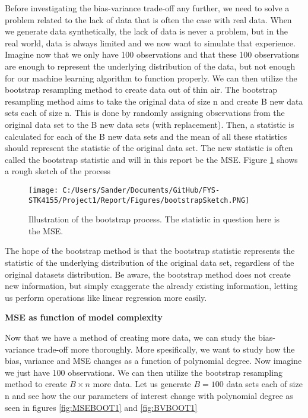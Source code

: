 \documentclass[12pt,a4paper]{article}
\begin{document}
\noindent Before investigating the bias-variance trade-off any further, we need to solve a problem related to the lack of data that is often the case with real data. When we generate data synthetically, the lack of data is never a problem, but in the real world, data is always limited and we now want to simulate that experience. Imagine now that we only have 100 observations and that these 100 observations are enough to represent the underlying distribution of the data, but not enough for our machine learning algorithm to function properly. We can then utilize the bootstrap resampling method to create data out of thin air. The bootstrap resampling method aims to take the original data of size n and create B new data sets each of size n. This is done by randomly assigning observations from the original data set to the B new data sets (with replacement). Then, a statistic is calculated for each of the B new data sets and the mean of all these statistics should represent the statistic of the original data set. The new statistic is often called the bootstrap statistic and will in this report be the MSE. Figure \ref{fig:Bootsketch} shows a rough sketch of the process

\begin{figure}[H]
\centering
\texttt{[image: C:/Users/Sander/Documents/GitHub/FYS-STK4155/Project1/Report/Figures/bootstrapSketch.PNG]}
\caption{\label{fig:Bootsketch} Illustration of the bootstrap process. The statistic in question here is the MSE.}
\end{figure}

\noindent The hope of the bootstrap method is that the bootstrap statistic represents the statistic of the underlying distribution of the original data set, regardless of the original datasets distribution. Be aware, the bootstrap method does not create new information, but simply exaggerate the already existing information, letting us perform operations like linear regression more easily.

\begin{center}
\large{\textbf{MSE as function of model complexity}}
\end{center}

\noindent Now that we have a method of creating more data, we can study the bias-variance trade-off more thoroughly. More spesifically, we want to study how the bias, variance and MSE changes as a function of polynomial degree. Now imagine we just have 100 observations. We can then utilize the bootstrap resampling method to create $B \times n$ more data. Let us generate $B = 100$ data sets each of size n and see how the our parameters of interest change with polynomial degree as seen in figures \ref{fig:MSEBOOT1} and \ref{fig:BVBOOT1}
\end{document}
